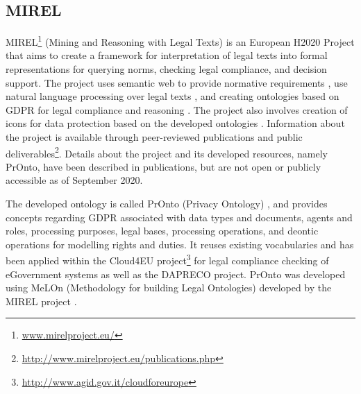 \subsection*{MIREL}\label{sec:sota:MIREL}
MIREL\footnote{\url{www.mirelproject.eu/}} (Mining and Reasoning with Legal Texts) is an European H2020 Project that aims to create a framework for interpretation of legal texts into formal representations for querying norms, checking legal compliance, and decision support. The project uses semantic web to provide normative requirements \cite{gandon_normative_2017}, use natural language processing over legal texts \cite{teruel_legal_2018}, and creating ontologies based on GDPR \cite{monica_legal_2018} for legal compliance \cite{palmirani_pronto_2018-1} and reasoning \cite{palmirani_pronto_2018}. The project also involves creation of icons for data protection based on the developed ontologies \cite{arianna_dapis_2019}.
Information about the project is available through peer-reviewed publications and public deliverables\footnote{\url{http://www.mirelproject.eu/publications.php}}.
Details about the project and its developed resources, namely PrOnto,
have  been described in publications, but are not open or publicly
accessible as of September 2020.

The developed ontology is called PrOnto (Privacy Ontology) \cite{monica_legal_2018}, and provides concepts regarding GDPR associated with data types and documents, agents and roles, processing purposes, legal bases, processing operations, and deontic operations for modelling rights and duties. It reuses existing vocabularies \cite{palmirani_pronto_2018} and has been applied within the Cloud4EU project\footnote{\url{http://www.agid.gov.it/cloudforeurope}} for legal compliance checking of eGovernment systems as well as the DAPRECO project.
PrOnto was developed using MeLOn (Methodology for building Legal
Ontologies) developed by the MIREL project \cite{palmirani_pronto_2018,palmirani_pronto_2018-1,monica_modelling_2018}.

